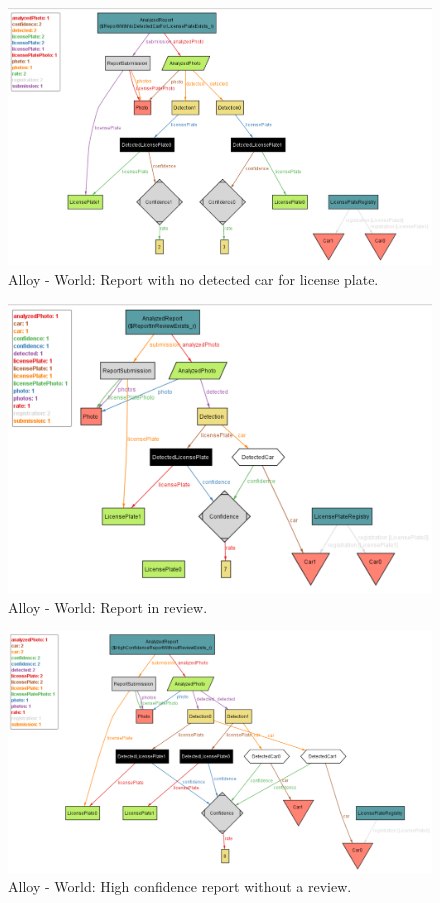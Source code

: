 \begin{figure}[H]
    \centering
    \includegraphics[width=\textwidth]{Images/alloy/4.png}
    \caption{\label{fig:alloy}Alloy - World: Report with no detected car for license plate.}
\end{figure}

\begin{figure}[H]
    \centering
    \includegraphics[width=\textwidth]{Images/alloy/5.png}
    \caption{\label{fig:alloy}Alloy - World: Report in review.}
\end{figure}

\begin{figure}[H]
    \centering
    \includegraphics[width=\textwidth]{Images/alloy/6.png}
    \caption{\label{fig:alloy}Alloy - World: High confidence report without a review.}
\end{figure}

